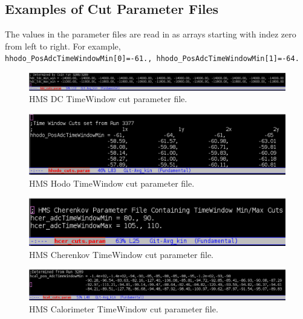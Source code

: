 \documentclass[14pt]{article}
\begin{document}
\begin{appendices}
\appendix
\section{Examples of Cut Parameter Files}
\label{appendix:AppxA}
The values in the parameter files are read in as arrays starting with indez zero from left to right. For example,\\ \texttt{hhodo\_PosAdcTimeWindowMin[0]=-61.,
  hhodo\_PosAdcTimeWindowMin[1]=-64.}
\begin{figure}[H]
  \captionsetup{justification=raggedright,singlelinecheck=false}
  \includegraphics[scale=0.4]{plots/hdc_parm_cut.png}
  \caption{HMS DC TimeWindow cut parameter file.}
  \label{fig:hms_dc_parm_cut}
\end{figure}
\begin{figure}[H]
  \captionsetup{justification=raggedright,singlelinecheck=false}
  \includegraphics[scale=0.4]{plots/hhodo_parm_cut.png}
  \caption{HMS Hodo TimeWindow cut parameter file.}
  \label{fig:hms_hod_parm_cut}
\end{figure}
\begin{figure}[H]
  \captionsetup{justification=raggedright,singlelinecheck=false}
  \includegraphics[scale=0.4]{plots/hcer_parm_cut.png}
  \caption{HMS Cherenkov TimeWindow cut parameter file.}
  \label{fig:hms_cer_parm_cut}
\end{figure}
\begin{figure}[H]
  \captionsetup{justification=raggedright,singlelinecheck=false}
  \includegraphics[scale=0.4]{plots/hcal_parm_cut.png}
  \caption{HMS Calorimeter TimeWindow cut parameter file.}
  \label{fig:hms_cal_parm_cut}
\end{figure}



\end{appendices}
\end{document}
